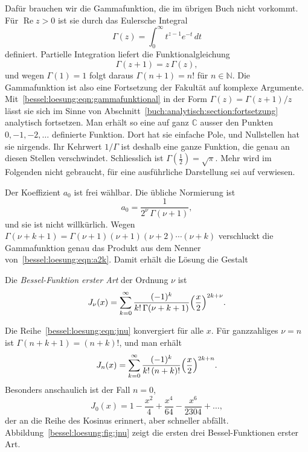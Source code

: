 Dafür brauchen wir die Gammafunktion, die im übrigen Buch nicht vorkommt.
Für $\operatorname{Re}z>0$ ist sie durch das Eulersche Integral
\begin{equation}
\Gamma(z)
=
\int_0^\infty t^{z-1}e^{-t}\,dt
\label{bessel:loesung:eqn:gammadef}
\end{equation}
definiert.
Partielle Integration liefert die Funktionalgleichung
\begin{equation}
\Gamma(z+1) = z\,\Gamma(z),
\label{bessel:loesung:eqn:gammafunktional}
\end{equation}
und wegen $\Gamma(1)=1$ folgt daraus $\Gamma(n+1)=n!$ für $n\in\mathbb{N}$.
Die Gammafunktion ist also eine Fortsetzung der Fakultät auf komplexe Argumente.
Mit~\eqref{bessel:loesung:eqn:gammafunktional} in der Form $\Gamma(z)=\Gamma(z+1)/z$ lässt sie sich im Sinne von Abschnitt~\ref{buch:analytisch:section:fortsetzung} analytisch fortsetzen.
Man erhält so eine auf ganz $\mathbb{C}$ ausser den Punkten $0,-1,-2,\dots$ definierte Funktion.
Dort hat sie einfache Pole, und Nullstellen hat sie nirgends.
Ihr Kehrwert $1/\Gamma$ ist deshalb eine ganze Funktion, die genau an diesen Stellen verschwindet.
Schliesslich ist $\Gamma(\frac12)=\sqrt{\pi}$.
Mehr wird im Folgenden nicht gebraucht, für eine ausführliche Darstellung sei auf \cite{bessel:abramowitz} verwiesen.

Der Koeffizient $a_0$ ist frei wählbar.
Die übliche Normierung ist
\begin{equation}
a_0
=
\frac{1}{2^\nu\,\Gamma(\nu+1)},
\label{bessel:loesung:eqn:normierung}
\end{equation}
und sie ist nicht willkürlich.
Wegen $\Gamma(\nu+k+1) = \Gamma(\nu+1)(\nu+1)(\nu+2)\cdots(\nu+k)$ verschluckt die Gammafunktion genau das Produkt aus dem Nenner von~\eqref{bessel:loesung:eqn:a2k}.
Damit erhält die Lösung die Gestalt
\begin{definition}
\label{bessel:loesung:def:jnu}
Die \emph{Bessel-Funktion erster Art} der Ordnung $\nu$
%
ist
\begin{equation}
J_\nu(x)
=
\sum_{k=0}^\infty
\frac{(-1)^k}{k!\,\Gamma(\nu+k+1)}
\Bigl(\frac{x}{2}\Bigr)^{2k+\nu}.
\label{bessel:loesung:eqn:jnu}
\end{equation}
\end{definition}
 
Die Reihe~\eqref{bessel:loesung:eqn:jnu} konvergiert für alle $x$.
Für ganzzahliges $\nu=n$ ist $\Gamma(n+k+1)=(n+k)!$, und man erhält
\[
J_n(x)
=
\sum_{k=0}^\infty
\frac{(-1)^k}{k!\,(n+k)!}
\Bigl(\frac{x}{2}\Bigr)^{2k+n}.
\]
Besonders anschaulich ist der Fall $n=0$,
\[
J_0(x)
=
1
-
\frac{x^2}{4}
+
\frac{x^4}{64}
-
\frac{x^6}{2304}
+
\dots,
\]
der an die Reihe des Kosinus erinnert, aber schneller abfällt.
Abbildung~\ref{bessel:loesung:fig:jnu} zeigt die ersten drei
Bessel-Funktionen erster Art.

